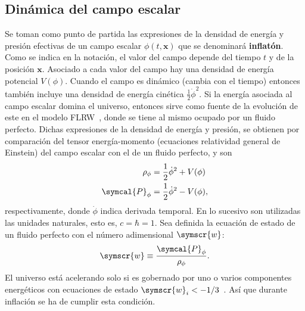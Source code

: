 \subsection{Dinámica del campo escalar}
Se toman como punto de partida las expresiones de la densidad de energía y presión efectivas de un campo escalar \(\phi\left(t,\symbf{x}\right)\) que se denominará \textbf{inflatón}. Como se indica en la notación, el valor del campo depende del tiempo \(t\) y de la posición \(\symbf{x}\). Asociado a cada valor del campo hay una densidad de energía potencial \(V(\phi)\). Cuando el campo es dinámico (cambia con el tiempo) entonces también incluye una densidad de energía cinética \(\frac{1}{2}\dot{\phi}^2\). Si la energía asociada al campo escalar domina el universo, entonces sirve como fuente de la evolución de este en el modelo FLRW~\cite{baumann2022cosmology}, donde se tiene al mismo ocupado por un fluido perfecto. Dichas expresiones de la densidad de energía y presión, se obtienen por comparación del tensor energía-momento (ecuaciones relatividad general de Einstein) del campo escalar con el de un fluido perfecto, y son
\begin{subequations}
    \begin{align}
        \rho_\phi       & =\frac{1}{2}\dot{\phi}^2+V(\phi)\label{eq::rho} \\
        \symcal{P}_\phi & =\frac{1}{2}\dot{\phi}^2-V(\phi),
    \end{align}
    \label{eq::eqscampo}
\end{subequations}
respectivamente, donde \(\dot{\phi}\) indica derivada temporal.
\newpage
En lo sucesivo son utilizadas las unidades naturales, esto es, \(c=\hbar=1\). Sea definida la ecuación de estado de un fluido perfecto con el número adimensional \(\symscr{w}\):
\begin{equation}
    \symscr{w}\equiv\frac{\symcal{P}_\phi}{\rho_\phi}.
\end{equation}
El universo está acelerando solo si es gobernado por uno o varios componentes energéticos con ecuaciones de estado \(\symscr{w}_i<-1/3\)~\cite{knobel2012introduction}. Así que durante inflación se ha de cumplir esta condición.

